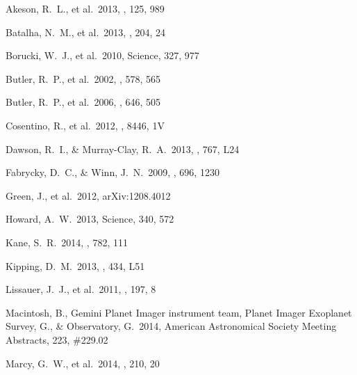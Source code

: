 \begin{thebibliography}

 Akeson, R.~L., et al.\ 2013, 
\pasp, 125, 989 %

 Batalha, N.~M., et al.\ 2013, 
\apjs, 204, 24 %

 Borucki, W.~J., et al.\ 2010, 
Science, 327, 977 %

 Butler, R.~P., et al.\ 2002, 
\apj, 578, 565 %

 Butler, R.~P., et al.\ 2006, 
\apj, 646, 505 %

 Cosentino, R., et al.\ 
2012, \procspie, 8446, 1V %

 Dawson, R.~I., \&
  Murray-Clay, R.~A.\ 2013, \apjl, 767, L24  %

 Fabrycky, D.~C., \&
  Winn, J.~N.\ 2009, \apj, 696, 1230 %
  
 Green, J., et al.\ 2012, 
arXiv:1208.4012   %

 Howard, A.~W.\ 2013, Science, 340,
  572 %

 Kane, S.~R.\ 2014, \apj, 782, 111 %
  
 Kipping, D.~M.\ 2013, \mnras,
  434, L51 %

 Lissauer, J.~J., et al.\ 
2011, \apjs, 197, 8 %

 Macintosh, B., Gemini 
Planet Imager instrument team, Planet Imager Exoplanet Survey, G., 
\& Observatory, G.\ 2014, American Astronomical Society Meeting
Abstracts, 223, \#229.02  %

 Marcy, G.~W., et al.\ 2014, \apjs, 
210, 20 %


\end{thebibliography}
